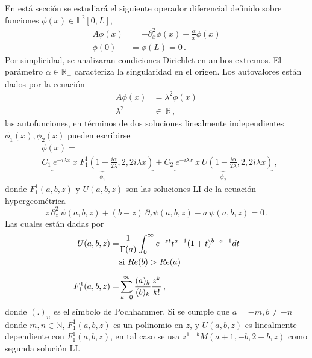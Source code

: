 En está sección se estudiará el siguiente operador diferencial definido sobre funciones $\phi (x)\in \mathbb{L} ^2 [0,L]$,
\begin{equation}
\begin{aligned}
    A \phi (x) &= - \partial ^2 _x  \phi(x) + \frac{\alpha}{x} \phi(x) \\[5pt]
    \phi(0) &= \phi(L) = 0 \, .
\end{aligned}
\label{operador}
\end{equation}
Por simplicidad, se analizaran condiciones Dirichlet en ambos extremos.  El parámetro $\alpha \in \mathbb{R _{+}}$ caracteriza la singularidad en el origen.
Los autovalores están dados por la ecuación 
\begin{equation}
\begin{aligned}
    A  \phi (x)  &=   \lambda ^2 \phi (x) \\[5pt]
    \lambda ^2 \ &\in \ \mathbb{R}  
    \, ,
\end{aligned}
\label{eq.aut.sin}
\end{equation}
las autofunciones, en términos de dos soluciones linealmente independientes $\phi _1 (x), \phi _2 (x)$ pueden escribirse
\begin{align}
\label{eq.phi}
&
    \phi (x) =
\\
&
	    C _1
    	\underbrace{
				     \ e ^{-i \lambda x} \ x \ 
				     F _{1} ^{1} 
				     		\left(  
				     			1 - \frac{i \alpha}
				     			{2\lambda}
				     		,2,2 i \lambda x \right) 
				     } _ {\phi_1} + 
      C _2 
      \underbrace{ 
      			   \ e^{-i \lambda x } \ x \ 
      			   U 
      			   	\left( 
      			   		1- \frac{i \alpha}{2 \lambda}
      			   		,2,2 i \lambda x \right) } _{\phi_2} 
    \, ,
\nonumber
\end{align}
donde $F _1 ^1(a,b,z)$ y $ U(a,b,z)$ son las soluciones LI de la ecuación {\mbox{hypergeométrica} }
\begin{equation}
    z \ \partial ^2 _z \ \psi (a,b,z) + (b-z) \
    \partial _z \psi (a,b,z)
    -a \ \psi (a,b,z) = 0 \, .
\end{equation}
Las cuales están dadas por \cite{Abramowitz:hyper}
\begin{align}
	U(a,b,z) = &\frac{1}{\Gamma (a)} 
	\int _0 ^{\infty} e ^{-zt}
	t ^{a-1}
	(1+t) ^{b-a-1}
	dt \\
	& {\rm si \ } Re (b) > Re(a) 
	\nonumber
	\\[5pt]
	F _1 ^1 (a,b,z) =& \sum _ {k=0} ^{\infty} 
	\frac{(a) _k}{(b) _k} 
	\frac{z ^k}{k!} 
	\, ,
\end{align}
donde $(.) _n$ es el símbolo de Pochhammer.
Si se cumple que  $a=-m,b \neq -n$ donde $ m,n \in \mathbb{N}$, $F _1 ^1 (a,b,z)$ es un polinomio en $z$, y $U(a,b,z)$ es linealmente dependiente con $F _1 ^1 (a,b,z)$, en tal caso se usa $z^{1-b} M(a+1,-b,2-b,z)$ como segunda solución LI.



